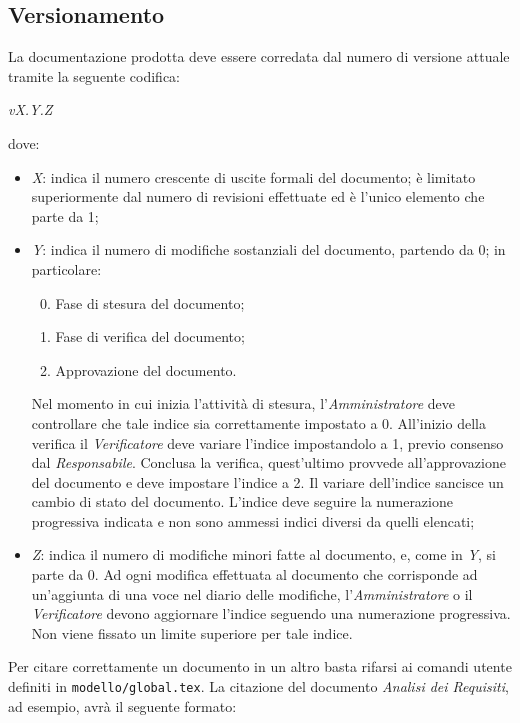\subsection{Versionamento}
La documentazione prodotta deve essere corredata dal numero di versione attuale tramite la seguente codifica:
\begin{center}
\textit{vX.Y.Z}
\end{center}
dove:
\begin{itemize}
\item \textit{X}: indica il numero crescente di uscite formali del documento; è limitato superiormente dal numero di revisioni effettuate ed è l'unico elemento che parte da 1;
\item \textit{Y}: indica il numero di modifiche sostanziali del documento, partendo da 0; in particolare:
\begin{enumerate}
\setcounter{enumi}{-1}
\item Fase di stesura del documento;
\item Fase di verifica del documento;
\item Approvazione del documento.
\end{enumerate}
Nel momento in cui inizia l'attività di stesura, l'\textit{Amministratore} deve
controllare che tale indice sia correttamente impostato a 0. All'inizio della verifica
il \textit{Verificatore} deve variare l'indice impostandolo a 1, previo consenso
dal \textit{Responsabile}. Conclusa la verifica, quest'ultimo provvede all'approvazione
del documento e deve impostare l'indice a 2.
Il variare dell'indice sancisce un cambio di stato del documento. L'indice deve
seguire la numerazione progressiva indicata e non sono ammessi indici diversi da
quelli elencati;
\item \textit{Z}: indica il numero di modifiche minori fatte al documento, e, come in \textit{Y}, si parte da 0. Ad
ogni modifica effettuata al documento che corrisponde ad un'aggiunta di una voce
nel diario delle modifiche, l'\textit{Amministratore} o il \textit{Verificatore} devono aggiornare l'indice
seguendo una numerazione progressiva. Non viene fissato un limite superiore per
tale indice.
\end{itemize}
Per citare correttamente un documento in un altro basta rifarsi ai comandi utente definiti in \texttt{modello/global.tex}. La citazione del documento \textit{Analisi dei Requisiti}, ad esempio, avrà il seguente formato: 
\begin{center}
\AnalisiDeiRequisiti
\end{center}

